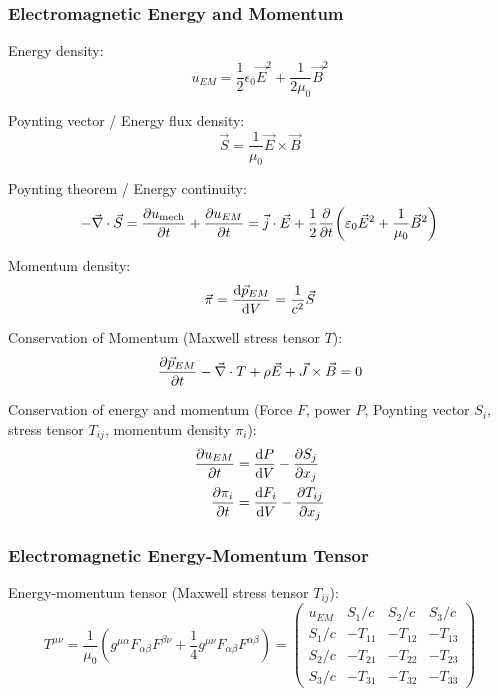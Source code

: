 		\subsubsection{Electromagnetic Energy and Momentum}
			\noindent
			Energy density:
			\begin{equation}
				u_{EM}=\frac{1}{2}\epsilon_0 \vec{E}^2+\frac{1}{2\mu_0}\vec{B}^2
			\end{equation}

			\noindent
			Poynting vector / Energy flux density:
			\begin{equation}
				\vec{S} = \frac{1}{\mu_0}\vec{E}\times\vec{B}
			\end{equation}

			\noindent
			Poynting theorem / Energy continuity:
			\begin{equation}
				-\vec{\nabla}\cdot\vec{S}
				= \pdv{u_{\mathrm{mech}}}{t} + \pdv{u_{EM}}{t}
				= \vec{j}\cdot\vec{E} + \frac{1}{2}\pdv{t}\qty(\varepsilon_0\vec{E}^2 + \frac{1}{\mu_0}\vec{B}^2)
			\end{equation}

			\noindent
			Momentum density:
			\begin{equation}
				\vec{\pi} = \dv{\vec{p}_{EM}}{V} = \frac{1}{c^2}\vec{S}
			\end{equation}

			\noindent
			Conservation of Momentum (Maxwell stress tensor $T$):
			\begin{equation}
				\pdv{\vec{p}_{EM}}{t} - \vec{\nabla}\cdot T + \rho \vec{E} + \vec{J}\times\vec{B} = 0
			\end{equation}

			\noindent
			Conservation of energy and momentum (Force $F$, power $P$, Poynting vector $S_i$, stress tensor $T_{ij}$, momentum density $\pi_i$):
			\begin{equation}
				\begin{aligned}
					\pdv{u_{EM}}{t} &= \dv{P}{V} - \pdv{S_j}{x_j} \\
					\pdv{\pi_i}{t} &=	\dv{F_i}{V} - \pdv{T_{ij}}{x_j}
				\end{aligned}
			\end{equation}

		\subsubsection{Electromagnetic Energy-Momentum Tensor}
			\noindent
			Energy-momentum tensor (Maxwell stress tensor $T_{ij}$):
			\begin{equation}
				T^{\mu\nu} = \frac{1}{\mu_0}\left(g^{\mu\alpha} F_{\alpha\beta} F^{\beta\nu} +\frac{1}{4}g^{\mu\nu} F_{\alpha\beta} F^{\alpha\beta} \right)
				= \left( \begin{matrix}
					u_{EM} & S_1/c & S_2/c & S_3/c \\
					S_1/c & -T_{11} & -T_{12} & -T_{13} \\
					S_2/c	& -T_{21} & -T_{22} & -T_{23} \\
					S_3/c & -T_{31} & -T_{32} & -T_{33}
				\end{matrix} \right)
			\end{equation}


